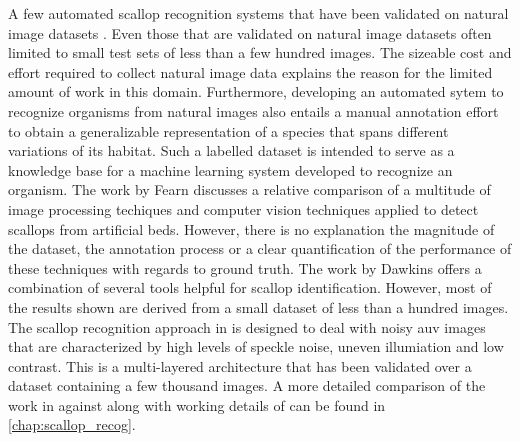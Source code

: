 \documentclass {udthesis}
\begin{document}
A few automated scallop recognition systems that have been validated on natural image datasets \cite{dawkings13,guomundsson,fearn, prasanna_med, prasanna_aslo, prasanna_igi}. Even those that are validated on natural image datasets often limited to small test sets of less than a few hundred images. The sizeable cost and effort required to collect natural image data explains the reason for the limited amount of work in this domain. Furthermore, developing an automated sytem to recognize organisms from natural images also entails a manual annotation effort to obtain a generalizable representation of a species that spans different variations of its habitat. Such a labelled dataset is intended to serve as a knowledge base for a machine learning system developed to recognize an organism. The work by Fearn \cite{fearn} discusses a relative comparison of a multitude of image processing techiques and computer vision techniques applied to detect scallops from artificial beds. However, there is no explanation the magnitude of the dataset, the annotation process or a clear quantification of the performance of these techniques with regards to ground truth.  The work by Dawkins \cite{dawkings13} offers a combination of several tools helpful for scallop identification. However, most of the results shown are derived from a small dataset of less than a hundred images. The scallop recognition approach in \cite{prasanna_med, prasanna_aslo, prasanna_igi} is designed to deal with noisy \gls{auv} images that are characterized by high levels of speckle noise, uneven illumiation and low contrast. This is a multi-layered architecture that has been validated over a dataset containing a few thousand images. A more detailed comparison of the work in \cite{dawkings13} against \cite{prasanna_igi} along with working details of \cite{prasanna_igi} can be found in \ref{chap:scallop_recog}.


\printglossary[type=\acronymtype]                  
\end{document}
